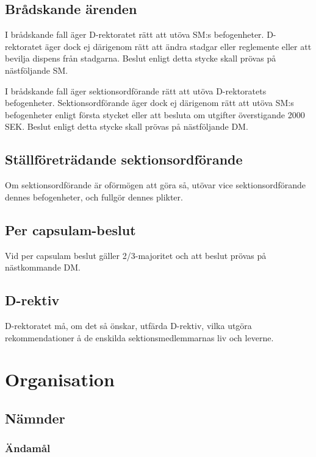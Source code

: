 \documentclass{dgovdoc}
\begin{document}
\subsection{Brådskande ärenden}

I brådskande fall äger D-rektoratet rätt att utöva SM:s befogenheter.
D-rektoratet äger dock ej därigenom rätt att ändra stadgar eller reglemente
eller att bevilja dispens från stadgarna. Beslut enligt detta stycke skall
prövas på nästföljande SM.

I brådskande fall äger sektionsordförande rätt att utöva D-rektoratets
befogenheter. Sektionsordförande äger dock ej därigenom rätt att utöva SM:s
befogenheter enligt första stycket eller att besluta om utgifter överstigande
2000 SEK. Beslut enligt detta stycke skall prövas på nästföljande DM.

\subsection{Ställföreträdande sektionsordförande}

Om sektionsordförande är oförmögen att göra så, utövar vice sektionsordförande
dennes befogenheter, och fullgör dennes plikter.

\subsection{Per capsulam-beslut}

Vid per capsulam beslut gäller 2/3-majoritet och att beslut prövas på
nästkommande DM.

\subsection{D-rektiv}

D-rektoratet må, om det så önskar, utfärda D-rektiv, vilka utgöra
rekommendationer å de enskilda sektionsmedlemmarnas liv och leverne.

\section{Organisation}

\subsection{Nämnder}
\label{sec:namnder}

\subsubsection{Ändamål}
\end{document}
